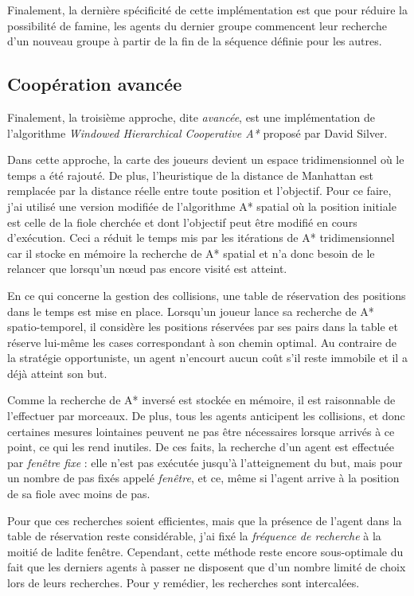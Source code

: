 \documentclass[letterpaper]{article}
\begin{document}
Finalement, la derni\`ere sp\'ecificit\'e de cette impl\'ementation est que pour r\'eduire la possibilit\'e de famine, les agents du dernier groupe commencent leur recherche d'un nouveau groupe \`a partir de la fin de la s\'equence d\'efinie pour les autres.

\subsection{Coop\'eration avanc\'ee}
Finalement, la troisi\`eme approche, dite \textit{avanc\'ee}, est une impl\'ementation de l'algorithme \textit{Windowed Hierarchical Cooperative A*} propos\'e par David Silver. %

Dans cette approche, la carte des joueurs devient un espace tridimensionnel o\`u le temps a \'et\'e rajout\'e.
De plus, l'heuristique de la distance de Manhattan est remplac\'ee par la distance r\'eelle entre toute position et l'objectif.
Pour ce faire, j'ai utilis\'e une version modifi\'ee de l'algorithme A* spatial o\`u la position initiale est celle de la fiole cherch\'ee et dont l'objectif peut \^etre modifi\'e en cours d'ex\'ecution.
Ceci a r\'eduit le temps mis par les it\'erations de A* tridimensionnel car il stocke en m\'emoire la recherche de A* spatial et n'a donc besoin de le relancer que lorsqu'un n\oe ud pas encore visit\'e est atteint.

En ce qui concerne la gestion des collisions, une table de r\'eservation des positions  dans le temps est mise en place.
Lorsqu'un joueur lance sa recherche de A* spatio-temporel, il consid\`ere les positions r\'eserv\'ees par ses pairs dans la table et r\'eserve lui-m\^eme les cases correspondant \`a son chemin optimal.
Au contraire de la strat\'egie opportuniste, un agent n'encourt aucun co\^ut s'il reste immobile et il a d\'ej\`a atteint son but.

Comme la recherche de A* invers\'e est stock\'ee en m\'emoire, il est raisonnable de l'effectuer par morceaux.
De plus, tous les agents anticipent les collisions, et donc certaines mesures lointaines peuvent ne pas \^etre n\'ecessaires lorsque arriv\'es \`a ce point, ce qui les rend inutiles.
De ces faits, la recherche d'un agent est effectu\'ee par \textit{fen\^etre fixe} : elle n'est pas ex\'ecut\'ee jusqu'\`a l'atteignement du but, mais pour un nombre de pas fix\'es appel\'e \textit{fen\^etre}, et ce, m\^eme si l'agent arrive \`a la position de sa fiole avec moins de pas.

Pour que ces recherches soient efficientes, mais que la pr\'esence de l'agent dans la table de r\'eservation reste consid\'erable, j'ai fix\'e la \textit{fr\'equence de recherche} \`a la moiti\'e de ladite fen\^etre.
Cependant, cette m\'ethode reste encore sous-optimale du fait que les derniers agents \`a passer ne disposent que d'un nombre limit\'e de choix lors de leurs recherches.
Pour y rem\'edier, les recherches sont intercal\'ees. 
\end{document}

